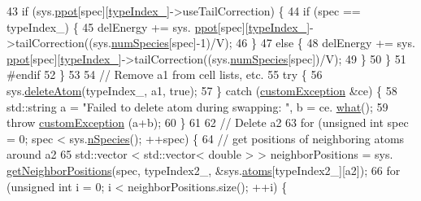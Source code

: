 \begin{DoxyCode}
43         \textcolor{keywordflow}{if} (sys.\hyperlink{classsim_system_a8d6271751a62f61edcf57f773540a4a3}{ppot}[spec][\hyperlink{classmc_move_acb731965547b0326ef318ec96da8b46a}{typeIndex\_}]->useTailCorrection) \{
44                 \textcolor{keywordflow}{if} (spec == typeIndex\_) \{
45                                                                 delEnergy += sys.
      \hyperlink{classsim_system_a8d6271751a62f61edcf57f773540a4a3}{ppot}[spec][\hyperlink{classmc_move_acb731965547b0326ef318ec96da8b46a}{typeIndex\_}]->tailCorrection((sys.\hyperlink{classsim_system_a9eea865e6dc1cff377b1e79c4d9c23f0}{numSpecies}[spec]-1)/V);
46                                                 \}
47                                                 \textcolor{keywordflow}{else} \{
48                                                                 delEnergy += sys.
      \hyperlink{classsim_system_a8d6271751a62f61edcf57f773540a4a3}{ppot}[spec][\hyperlink{classmc_move_acb731965547b0326ef318ec96da8b46a}{typeIndex\_}]->tailCorrection((sys.\hyperlink{classsim_system_a9eea865e6dc1cff377b1e79c4d9c23f0}{numSpecies}[spec])/V);
49                                                 \}
50                                 \}
51 \textcolor{preprocessor}{#endif}
52     \}
53     
54     \textcolor{comment}{// Remove a1 from cell lists, etc.}
55     \textcolor{keywordflow}{try} \{
56                 sys.\hyperlink{classsim_system_acabf4fc5b5b90bba62e1449ddb3646c6}{deleteAtom}(typeIndex\_, a1, \textcolor{keyword}{true});
57     \} \textcolor{keywordflow}{catch} (\hyperlink{classcustom_exception}{customException} &ce) \{
58                 std::string a = \textcolor{stringliteral}{"Failed to delete atom during swapping: "}, b = ce.
      \hyperlink{classcustom_exception_aeb6ab5848b038adfc68fde86a512f691}{what}();
59                 \textcolor{keywordflow}{throw} \hyperlink{classcustom_exception}{customException} (a+b);
60     \}
61     
62                 \textcolor{comment}{// Delete a2}
63     \textcolor{keywordflow}{for} (\textcolor{keywordtype}{unsigned} \textcolor{keywordtype}{int} spec = 0; spec < sys.\hyperlink{classsim_system_ab5e2e9b6204de15520302fe1d51688dd}{nSpecies}(); ++spec) \{
64         \textcolor{comment}{// get positions of neighboring atoms around a2}
65         std::vector < std::vector< double > > neighborPositions = sys.
      \hyperlink{classsim_system_a7ac49b2311cd8230df8d078a9d897b35}{getNeighborPositions}(spec, typeIndex2\_, &sys.\hyperlink{classsim_system_a90421b19082f7fb8fc23b7264b1161e4}{atoms}[typeIndex2\_][a2]);
66         \textcolor{keywordflow}{for} (\textcolor{keywordtype}{unsigned} \textcolor{keywordtype}{int} i = 0; i < neighborPositions.size(); ++i) \{

\end{DoxyCode}
